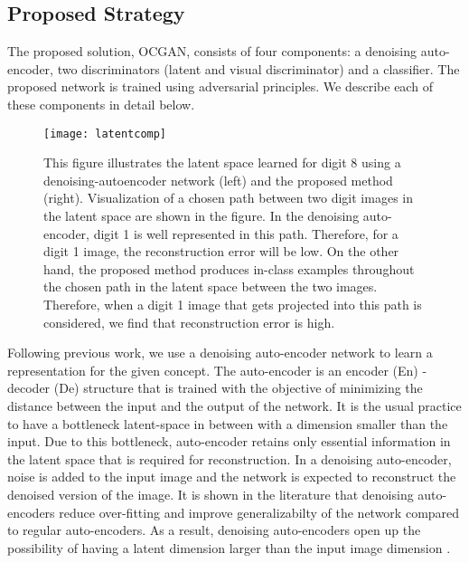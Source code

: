 \documentclass[10pt,twocolumn,letterpaper]{article}
\begin{document}
\subsection{Proposed Strategy}
The proposed solution, OCGAN, consists of four components: a denoising auto-encoder, two discriminators (latent and visual discriminator) and a classifier. The proposed network is trained using adversarial principles. We describe each of these components in detail below.

\begin{figure}
    \centering
\texttt{[image: latentcomp]}\hskip30pt
    \caption{ This figure illustrates the latent space learned for digit 8 using a denoising-autoencoder network (left) and the proposed method (right). Visualization of a chosen path between two digit images in the latent space are shown in the figure. In the denoising auto-encoder, digit 1 is well represented in this path. Therefore, for a digit 1 image, the reconstruction error will be low. On the other hand, the proposed method produces in-class examples throughout the chosen path in the latent space between the two images. Therefore, when a digit 1 image that gets projected into this path is considered, we find that reconstruction error is high.}
    \label{fig:latentcomp}
\end{figure}












 Following previous work, we use a denoising auto-encoder network to learn a representation for the given concept. The auto-encoder is an encoder (En) - decoder (De) structure that is trained with the objective of minimizing the distance between the input and the output of the network. It is the usual practice to have a bottleneck latent-space in between with a dimension smaller than the input.  Due to this bottleneck, auto-encoder retains only essential information in the latent space that is required for reconstruction. In a denoising auto-encoder, noise is added to the input image and the network is expected to reconstruct the denoised version of the image. It is shown in the literature that denoising auto-encoders reduce over-fitting and improve generalizabilty of the network compared to regular auto-encoders. As a result, denoising auto-encoders open up the possibility of having a latent dimension larger than the input image dimension \cite{Vincent:2008:AE}.  
\end{document}

